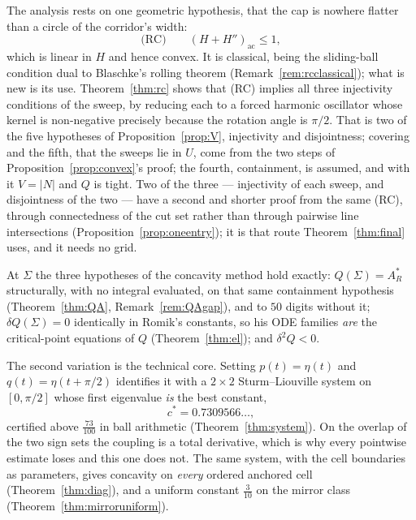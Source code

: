 \documentclass[11pt]{article}
\theoremstyle{definition}
\newcommand{\Sig}{\Sigma}
\begin{document}
The analysis rests on one geometric hypothesis, that the cap is nowhere flatter than a
circle of the corridor's width:
\[
  \text{(RC)}\qquad (H+H'')_{\mathrm{ac}}\le1 ,
\]
which is linear in $H$ and hence convex. It is classical, being the sliding-ball condition
dual to Blaschke's rolling theorem (Remark~\ref{rem:rcclassical}); what is new is its use.
Theorem~\ref{thm:rc} shows that (RC) implies all three injectivity conditions of the
sweep, by reducing each to a forced harmonic oscillator whose kernel is non-negative
precisely because the rotation angle is $\pi/2$. That is two of the five hypotheses of
Proposition~\ref{prop:V}, injectivity and disjointness; covering and the fifth, that the
sweeps lie in $U$, come from the two steps of Proposition~\ref{prop:convex}'s proof; the
fourth, containment, is assumed, and with it $V=|N|$ and $Q$
is tight. Two of the three --- injectivity of each sweep, and disjointness of the two ---
have a second and shorter proof from the same (RC), through connectedness of the cut set
rather than through pairwise line intersections (Proposition~\ref{prop:oneentry}); it is
that route Theorem~\ref{thm:final} uses, and it needs no grid.

At $\Sig$ the three hypotheses of the concavity method hold exactly:
$Q(\Sig)=A_R^\ast$ structurally, with no integral evaluated, on that same containment
hypothesis (Theorem~\ref{thm:QA}, Remark~\ref{rem:QAgap}), and to $50$ digits without it;
$\delta Q(\Sig)=0$ identically in Romik's constants, so his ODE families \emph{are} the
critical-point equations of $Q$ (Theorem~\ref{thm:el}); and $\delta^2Q<0$.

The second variation is the technical core. Setting $p(t)=\eta(t)$ and $q(t)=\eta(t+\pi/2)$
identifies it with a $2\times2$ Sturm--Liouville system on $[0,\pi/2]$ whose first
eigenvalue \emph{is} the best constant,
\[
  c^\ast=0.7309566\ldots,
\]
certified above $\tfrac{73}{100}$ in ball arithmetic (Theorem~\ref{thm:system}). On the
overlap of the two sign sets the coupling is a total derivative, which is why every
pointwise estimate loses and this one does not. The same system, with the cell boundaries
as parameters, gives concavity on \emph{every} ordered anchored cell
(Theorem~\ref{thm:diag}), and a uniform constant $\tfrac3{10}$ on the mirror class
(Theorem~\ref{thm:mirroruniform}).
\end{document}

